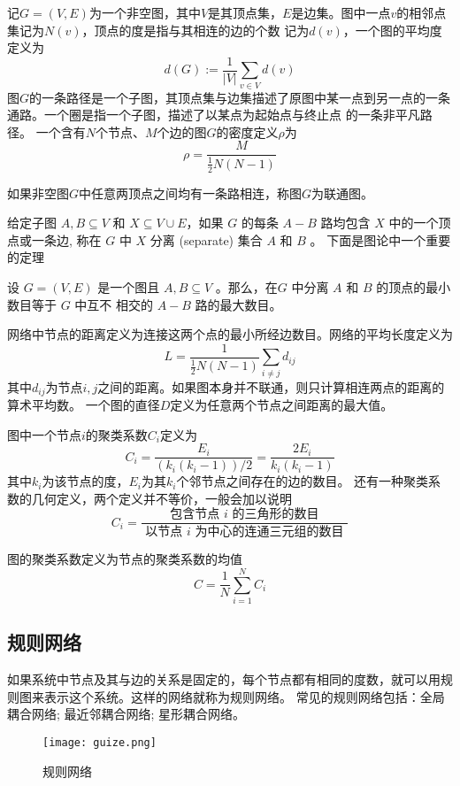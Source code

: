 记$G=(V,E)$为一个非空图，其中$V$是其顶点集，$E$是边集。图中一点$v$的相邻点集记为$N(v)$，顶点的度是指与其相连的边的个数
记为$d(v)$，一个图的平均度定义为
\begin{equation}
    d(G):=\frac{1}{|V|} \sum_{v \in V} d(v)
\end{equation}
图$G$的一条路径是一个子图，其顶点集与边集描述了原图中某一点到另一点的一条通路。一个圈是指一个子图，描述了以某点为起始点与终止点
的一条非平凡路径。
一个含有$N$个节点、$M$个边的图$G$的密度定义$\rho$为
\begin{equation}
    \rho=\frac{M}{\frac{1}{2} N(N-1)}
\end{equation}
\begin{definition}
    如果非空图$G$中任意两顶点之间均有一条路相连，称图$G$为联通图。
\end{definition}
给定子图 $A,B \subseteq V$ 和 $X \subseteq V \cup E$，如果 $G$ 的每条 $A-B$ 路均包含 $X$ 中的一个顶点或一条边,
称在 $G$ 中 $X$ 分离 (separate) 集合 $A$ 和 $B$ 。
下面是图论中一个重要的定理
\begin{theorem}
    设 $G=(V,E)$ 是一个图且 $A,B \subseteq V$ 。那么，在$G$ 中分离 $A$ 和 $B$ 的顶点的最小数目等于 $G$ 中互不
    相交的 $A-B$ 路的最大数目。
\end{theorem}
网络中节点的距离定义为连接这两个点的最小所经边数目。网络的平均长度定义为
\begin{equation}
    L=\frac{1}{\frac{1}{2} N(N-1)} \sum_{i \neq j} d_{i j}
\end{equation}
其中$d_{ij}$为节点$i,j$之间的距离。如果图本身并不联通，则只计算相连两点的距离的算术平均数。
一个图的直径$D$定义为任意两个节点之间距离的最大值。
\begin{definition}
    图中一个节点$i$的聚类系数$C_i$定义为
\begin{equation}
    C_i=\frac{E_i}{\left(k_i\left(k_i-1\right)\right) / 2}=\frac{2 E_i}{k_i\left(k_i-1\right)}
\end{equation}
其中$k_i$为该节点的度，$E_i$为其$k_i$个邻节点之间存在的边的数目。
还有一种聚类系数的几何定义，两个定义并不等价，一般会加以说明
\begin{equation}
    C_i=\frac{\text { 包含节点 } i \text { 的三角形的数目 }}{\text { 以节点 } i \text { 为中心的连通三元组的数目 }}
\end{equation}
\end{definition}
图的聚类系数定义为节点的聚类系数的均值
\begin{equation}
    C=\frac{1}{N} \sum_{i=1}^N C_i
\end{equation}
\subsection{规则网络}
如果系统中节点及其与边的关系是固定的，每个节点都有相同的度数，就可以用规则图来表示这个系统。这样的网络就称为规则网络。
常见的规则网络包括：全局耦合网络; 最近邻耦合网络; 星形耦合网络。
\begin{figure}[!htbp]
    \centering
    \texttt{[image: guize.png]}
    \caption{规则网络}
\end{figure}

